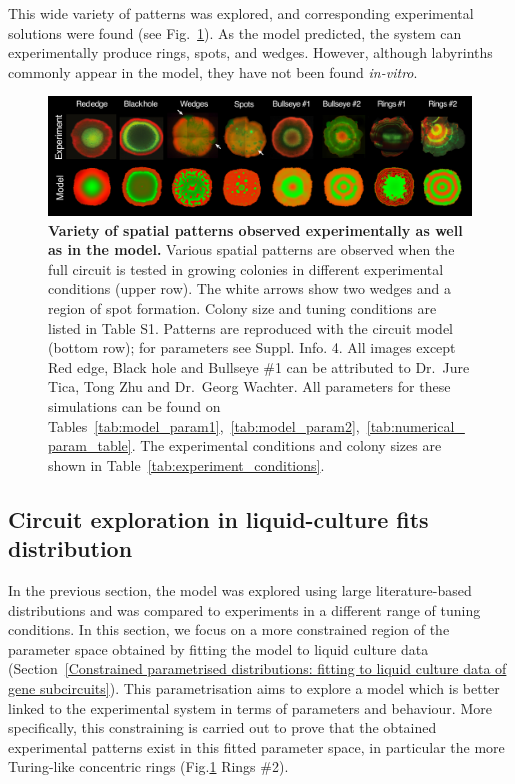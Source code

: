 This wide variety of patterns was explored, and corresponding experimental solutions were found (see Fig.~\ref{comparison_colonies_model_vs_experiment}).
As the model predicted, the system can experimentally produce rings, spots, and wedges.
However, although labyrinths commonly appear in the model, they have not been found \textit{in-vitro}.


\begin{figure}[H]
    \centering

    \includegraphics[width=1\textwidth]{chapters/Chapter 3/comparison_colonies_model_vs_experiment}
    \caption{\textbf{Variety of spatial patterns observed experimentally as well as in the model.} Various spatial patterns are observed when the full circuit is tested in growing colonies in different experimental conditions (upper row). The white arrows show two wedges and a region of spot formation. Colony size and tuning conditions are listed in Table S1. Patterns are reproduced with the circuit model (bottom row); for parameters see Suppl. Info. 4. All images except Red edge, Black hole and Bullseye \#1 can be attributed to Dr.~Jure Tica, Tong Zhu and Dr.~Georg Wachter. All parameters for these simulations can be found on Tables~\ref{tab:model_param1},~\ref{tab:model_param2},~\ref{tab:numerical_param_table}. The experimental conditions and colony sizes are shown in Table~\ref{tab:experiment_conditions}.}
    \label{comparison_colonies_model_vs_experiment}
\end{figure}


\subsection{Circuit exploration in liquid-culture fits distribution}
In the previous section, the model was explored using large literature-based distributions and was compared to experiments in a different range of tuning conditions.
In this section, we focus on a more constrained region of the parameter space obtained by fitting the model to liquid culture data (Section~\ref{Constrained parametrised distributions: fitting to liquid culture data of gene subcircuits}).
This parametrisation aims to explore a model which is better linked to the experimental system in terms of parameters and behaviour.
More specifically, this constraining is carried out to prove that the obtained experimental patterns exist in this fitted parameter space, in particular the more Turing-like concentric rings (Fig.\ref{comparison_colonies_model_vs_experiment} Rings \#2).



